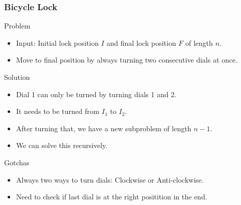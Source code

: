 \documentclass{beamer}
\begin{document}
\begin{frame}
    \frametitle{Bicycle Lock}
    \begin{block}{Problem}
        \begin{itemize}
            \item Input: Initial lock position $I$ and final lock position $F$ of length $n$.
            \item Move to final position by always turning two consecutive dials at once.
        \end{itemize}
    \end{block}
    \begin{block}{Solution}
        \begin{itemize}
            \item Dial 1 can only be turned by turning dials 1 and 2.
            \item It needs to be turned from $I_1$ to $I_2$.
            \item After turning that, we have a new subproblem of length $n-1$.
            \item We can solve this recursively.
        \end{itemize}
    \end{block}
    \begin{block}{Gotchas}
        \begin{itemize}
            \item Always two ways to turn dials: Clockwise or Anti-clockwise.
            \item Need to check if last dial is at the right positition in the end.
        \end{itemize}
    \end{block}
\end{frame}
\end{document}
